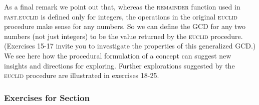 \documentclass{book}
\begin{document}
As a final remark we point out that, whereas the \textsc{remainder} function
used in \textsc{fast.euclid} is defined only for integers, the operations in the
original \textsc{euclid} procedure make sense for any numbers. So we can define
the GCD for any two numbers (not just integers) to be the value returned
by the \textsc{euclid} procedure. (Exercises 15-17 invite you to investigate the
properties of this generalized GCD.) We see here how the procedural
formulation of a concept can suggest new insights and directions for
exploring. Further explorations suggested by the \textsc{euclid} procedure are
illustrated in exercises 18-25.

\subsubsection{Exercises for Section \thesection}
\end{document}
